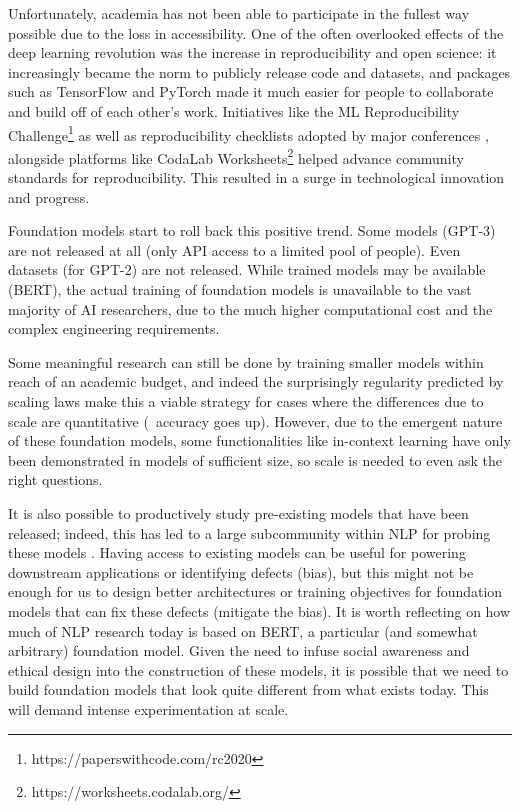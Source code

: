 Unfortunately, academia has not been able to participate in the fullest way possible
due to the loss in accessibility.
One of the often overlooked effects of the deep learning revolution
was the increase in reproducibility and open science:
it increasingly became the norm to publicly release code and datasets, and
packages such as TensorFlow \citep{abadi2016tensorflow} and PyTorch
\citep{paszke2019pytorch} made it much easier for people to collaborate and
build off of each other’s work. 
Initiatives like the ML Reproducibility
Challenge\footnote{https://paperswithcode.com/rc2020} as well as
reproducibility checklists adopted by major conferences
\citep{pineau2020improving}, alongside platforms like CodaLab 
Worksheets\footnote{https://worksheets.codalab.org/} helped advance community
standards for reproducibility.
This resulted in a surge in technological innovation and progress.

Foundation models start to roll back this positive trend.
Some models (\eg{}GPT-3) are not released at all (only API access to a limited pool of people).
Even datasets (\eg{}for GPT-2) are not released.
While trained models may be available (\eg{}BERT),
the actual training of foundation models is
unavailable to the vast majority of AI researchers,
due to the much higher computational cost and the complex engineering requirements.

Some meaningful research can still be done by training smaller models within reach of an academic budget,
and indeed the surprisingly regularity predicted by scaling laws \citep{kaplan2020} make this a viable strategy
for cases where the differences due to scale are quantitative (\eg~accuracy goes up).
However, due to the emergent nature of these foundation models,
some functionalities like in-context learning have only been demonstrated in models of sufficient size,
so scale is needed to even ask the right questions.

It is also possible to productively study pre-existing models that have been released; indeed, this has
led to a large subcommunity within NLP for probing these models \citep{rogers2020primer, manning2020emergent}.
Having access to existing models can be useful for powering downstream applications or identifying defects (\eg{}bias),
but this might not be enough for us to design better architectures or training objectives for foundation models
that can fix these defects (\eg{}mitigate the bias).
It is worth reflecting on how much of NLP research today is based on BERT,
a particular (and somewhat arbitrary) foundation model.
Given the need to infuse social awareness and ethical design into the construction of these models,
it is possible that we need to build foundation models that look quite different from what exists today.
This will demand intense experimentation at scale.


